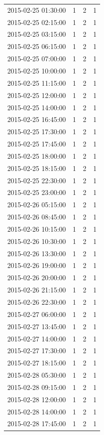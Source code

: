 \begin{tabular}{lrrr}
2015-02-25 01:30:00 & 1 & 2 & 1 \\
2015-02-25 02:15:00 & 1 & 2 & 1 \\
2015-02-25 03:15:00 & 1 & 2 & 1 \\
2015-02-25 06:15:00 & 1 & 2 & 1 \\
2015-02-25 07:00:00 & 1 & 2 & 1 \\
2015-02-25 10:00:00 & 1 & 2 & 1 \\
2015-02-25 11:15:00 & 1 & 2 & 1 \\
2015-02-25 12:00:00 & 1 & 2 & 1 \\
2015-02-25 14:00:00 & 1 & 2 & 1 \\
2015-02-25 16:45:00 & 1 & 2 & 1 \\
2015-02-25 17:30:00 & 1 & 2 & 1 \\
2015-02-25 17:45:00 & 1 & 2 & 1 \\
2015-02-25 18:00:00 & 1 & 2 & 1 \\
2015-02-25 18:15:00 & 1 & 2 & 1 \\
2015-02-25 22:30:00 & 1 & 2 & 1 \\
2015-02-25 23:00:00 & 1 & 2 & 1 \\
2015-02-26 05:15:00 & 1 & 2 & 1 \\
2015-02-26 08:45:00 & 1 & 2 & 1 \\
2015-02-26 10:15:00 & 1 & 2 & 1 \\
2015-02-26 10:30:00 & 1 & 2 & 1 \\
2015-02-26 13:30:00 & 1 & 2 & 1 \\
2015-02-26 19:00:00 & 1 & 2 & 1 \\
2015-02-26 20:00:00 & 1 & 2 & 1 \\
2015-02-26 21:15:00 & 1 & 2 & 1 \\
2015-02-26 22:30:00 & 1 & 2 & 1 \\
2015-02-27 06:00:00 & 1 & 2 & 1 \\
2015-02-27 13:45:00 & 1 & 2 & 1 \\
2015-02-27 14:00:00 & 1 & 2 & 1 \\
2015-02-27 17:30:00 & 1 & 2 & 1 \\
2015-02-27 18:15:00 & 1 & 2 & 1 \\
2015-02-28 05:30:00 & 1 & 2 & 1 \\
2015-02-28 09:15:00 & 1 & 2 & 1 \\
2015-02-28 12:00:00 & 1 & 2 & 1 \\
2015-02-28 14:00:00 & 1 & 2 & 1 \\
2015-02-28 17:45:00 & 1 & 2 & 1 \\

\end{tabular}
